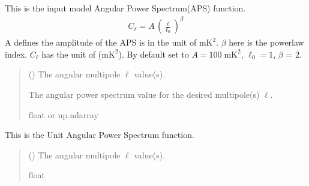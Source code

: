 \documentclass[a4paper,11pt,oneside,english,openany]{sphinxmanual}
\begin{document}
\begin{fulllineitems}
\label{\detokenize{simvis:simvis.aps}}
\pysigstartsignatures
{}
\pysigstopsignatures
\sphinxAtStartPar
This is the input model Angular Power Spectrum(APS) function.
\begin{equation*}
\begin{split}C_{\ell}=A\, \left(\frac{\ell}{\ell_0}\right)^{\beta}\end{split}
\end{equation*}
\sphinxAtStartPar
A defines the amplitude of the APS is in the unit of \(\text{mK}^2\). \(\beta\) here is the power\sphinxhyphen{}law index. \(C_{\ell}\) has the unit of  (\(\text{mK}^2\)). By default set to \(A = 100\;\text{mK}^2\), \(\ell_0=1\), \(\beta\) = \sphinxhyphen{}2.
\begin{quote}\begin{description}
\sphinxAtStartPar
{} () \textendash{} The angular multipole \({\ell}\) value(s).

\sphinxAtStartPar
The angular power spectrum value for the desired multipole(s) \({\ell}\).

\sphinxAtStartPar
float or np.ndarray

\end{description}\end{quote}

\end{fulllineitems}


\begin{fulllineitems}
\label{\detokenize{simvis:simvis.uaps}}
\pysigstartsignatures
{}
\pysigstopsignatures
\sphinxAtStartPar
This is the Unit Angular Power Spectrum function.
\begin{quote}\begin{description}
\sphinxAtStartPar
{} () \textendash{} The angular multipole \({\ell}\) value(s).


\sphinxAtStartPar
float

\end{description}\end{quote}

\end{fulllineitems}
\end{document}
